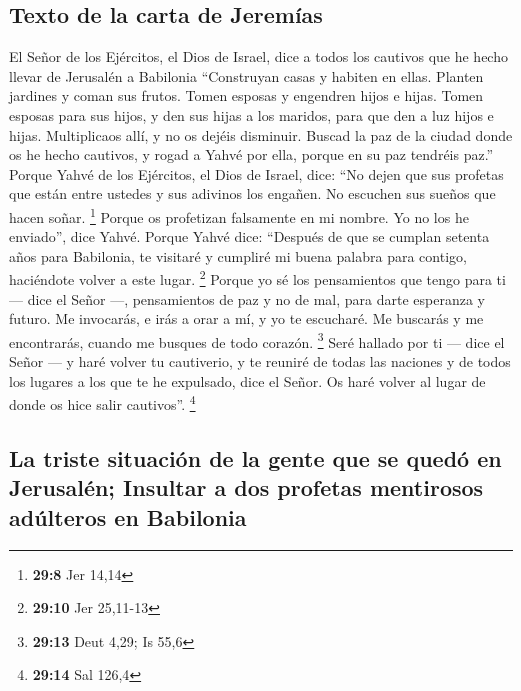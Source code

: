 \begin{paracol}{2}
\hypertarget{texto-de-la-carta-de-jeremuxedas}{%
\subsection{Texto de la carta de
Jeremías}\label{texto-de-la-carta-de-jeremuxedas}}

 El Señor de los Ejércitos, el Dios de Israel, dice a
todos los cautivos que he hecho llevar de Jerusalén a Babilonia
 ``Construyan casas y habiten en ellas. Planten jardines y
coman sus frutos.  Tomen esposas y engendren hijos e
hijas. Tomen esposas para sus hijos, y den sus hijas a los maridos, para
que den a luz hijos e hijas. Multiplicaos allí, y no os dejéis
disminuir.  Buscad la paz de la ciudad donde os he hecho
cautivos, y rogad a Yahvé por ella, porque en su paz tendréis paz.''
 Porque Yahvé de los Ejércitos, el Dios de Israel, dice:
``No dejen que sus profetas que están entre ustedes y sus adivinos los
engañen. No escuchen sus sueños que hacen soñar. \footnote{\textbf{29:8}
  Jer 14,14}  Porque os profetizan falsamente en mi
nombre. Yo no los he enviado'', dice Yahvé.  Porque Yahvé
dice: ``Después de que se cumplan setenta años para Babilonia, te
visitaré y cumpliré mi buena palabra para contigo, haciéndote volver a
este lugar. \footnote{\textbf{29:10} Jer 25,11-13} 
Porque yo sé los pensamientos que tengo para ti --- dice el Señor ---,
pensamientos de paz y no de mal, para darte esperanza y futuro.
 Me invocarás, e irás a orar a mí, y yo te escucharé.
 Me buscarás y me encontrarás, cuando me busques de todo
corazón. \footnote{\textbf{29:13} Deut 4,29; Is 55,6} 
Seré hallado por ti --- dice el Señor --- y haré volver tu cautiverio, y
te reuniré de todas las naciones y de todos los lugares a los que te he
expulsado, dice el Señor. Os haré volver al lugar de donde os hice salir
cautivos''. \footnote{\textbf{29:14} Sal 126,4}

\hypertarget{la-triste-situaciuxf3n-de-la-gente-que-se-queduxf3-en-jerusaluxe9n-insultar-a-dos-profetas-mentirosos-aduxfalteros-en-babilonia}{%
\subsection{La triste situación de la gente que se quedó en Jerusalén;
Insultar a dos profetas mentirosos adúlteros en
Babilonia}\label{la-triste-situaciuxf3n-de-la-gente-que-se-queduxf3-en-jerusaluxe9n-insultar-a-dos-profetas-mentirosos-aduxfalteros-en-babilonia}}


\end{paracol}
